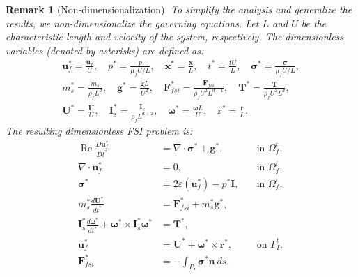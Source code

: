 \documentclass{article}
\newcommand{\bx}{{\mathbf{x}}}
\newcommand{\bu}{{\mathbf{u}}}
\newcommand{\Reynolds}{{\operatorname{Re}}}
\newtheorem{remark}[theorem]{Remark}
\begin{document}
\begin{remark}[Non-dimensionalization]
To simplify the analysis and generalize the results, we non-dimensionalize the governing equations. Let $L$ and $U$ be the characteristic length and velocity of the system, respectively. The dimensionless variables (denoted by asterisks) are defined as:
\begin{equation}
    \begin{aligned}
        \bu_f^* = \frac{\bu_f}{U},\quad
        p^* = \frac{p}{\mu_f U/L},\quad
        \bx^* = \frac{\bx}{L},\quad
        t^* = \frac{tU}{L},\quad
        \boldsymbol{\sigma}^* = \frac{\boldsymbol{\sigma}}{\mu_f U/L},\\
        m_s^* = \frac{m_s}{\rho_f L^d},\quad
        \mathbf{g}^* = \frac{\mathbf{g}L}{U^2},\quad
        \mathbf{F}_{fsi}^* = \frac{\mathbf{F}_{fsi}}{\rho_f U^2 L^{d-1}},\quad
        \mathbf{T}^* = \frac{\mathbf{T}}{\rho_f U^2 L^d},\\
        \mathbf{U}^* = \frac{\mathbf{U}}{U},\quad
        \mathbf{I}_s^* = \frac{\mathbf{I}_s}{\rho_f L^{d+2}},\quad
        \boldsymbol{\omega}^* = \frac{\boldsymbol{\omega}L}{U},\quad
        \mathbf{r}^* = \frac{\mathbf{r}}{L}.
    \end{aligned}
\end{equation}
The resulting dimensionless FSI problem is:
\begin{subequations}
    \begin{align}
        \Reynolds\frac{D\bu_f^*}{Dt^*}  &= \nabla\cdot\boldsymbol{\sigma}^* + \mathbf{g}^*, \quad &\text{in } \Omega_f^t, \label{subeq:ns}\\
        \nabla\cdot\bu_f^* &= 0, \quad &\text{in } \Omega_f^t,\label{subeq:incompressible}\\
        \boldsymbol{\sigma}^* &= 2\varepsilon(\bu_f^*) - p^*\mathbf{I}, \quad &\text{in } \Omega_f^t,\label{subeq:stress}\\
        m_s^*\frac{d\mathbf{U}^*}{dt^*} &= \mathbf{F}_{fsi}^* + m_s^* \mathbf{g}^*, \label{subeq:trans}\\
        \mathbf{I}_s^*\frac{d\boldsymbol{\omega}^*}{dt^*} + \boldsymbol{\omega}^*\times\mathbf{I}_s^*\boldsymbol{\omega}^* &= \mathbf{T}^*, \label{subeq:rot}\\
        \bu_f^* &= \mathbf{U}^* + \boldsymbol{\omega}^*\times \mathbf{r}^*, \quad &\text{on } \Gamma_I^t,\label{subeq:noslip}\\
        \mathbf{F}_{fsi}^* &= -\int_{\Gamma_I^t} \boldsymbol{\sigma}^*\mathbf{n}\ ds,\label{subeq:force} \\

\end{align}
\end{subequations}
\end{remark}
\end{document}
